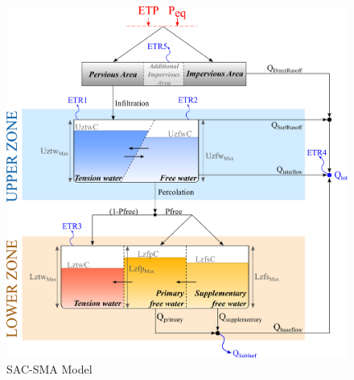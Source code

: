 \documentclass[
  letterpaper,
  DIV=11,
  numbers=noendperiod]{scrreprt}
\begin{document}
\begin{figure}

{\centering \includegraphics{./figures/fig-model_sac_sma.png}

}

\caption{\label{fig-model_sac_sma}SAC-SMA Model}

\end{figure}
\end{document}
